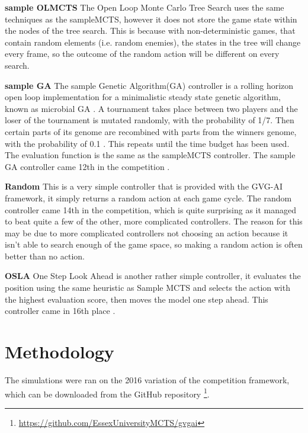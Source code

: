 \documentclass[journal]{IEEEtran}
\begin{document}
		\textbf{sample OLMCTS} \label{sssec:sampleOLMCTS}
			The Open Loop Monte Carlo Tree Search uses the same techniques as the sampleMCTS, however it does not store the game state within the nodes of the tree search. 
			This is because with non-deterministic games, that contain random elements (i.e. random enemies), the states in the tree will change every frame, so the outcome of the random action will be different on every search.
			

		\textbf{sample GA} \label{sssec:sampleGA}
			The sample Genetic Algorithm(GA) controller is a rolling horizon open loop implementation for a minimalistic steady state genetic algorithm, known as microbial GA \cite{harvey2009microbial, perez20162014}.
			A tournament takes place between two players and the loser of the tournament is mutated randomly, with the probability of 1/7. Then certain parts of its genome are recombined with parts from the winners genome, with the probability of 0.1 \cite{perez20162014}. 
			This repeats until the time budget has been used. The evaluation function is the same as the sampleMCTS controller. 
			The sample GA controller came 12th in the competition \cite{perez20162014}.
			

		\textbf{Random}
			This is a very simple controller that is provided with the GVG-AI framework, it simply returns a random action at each game cycle.
			The random controller came 14th in the competition, which is quite surprising as it managed to beat quite a few of the other, more complicated controllers. 
			The reason for this may be due to more complicated controllers not choosing an action because it isn't able to search enough of the game space, so making a random action is often better than no action.

		\textbf{OSLA}
			One Step Look Ahead is another rather simple controller, it evaluates the position using the same heuristic as Sample MCTS and selects the action with the highest evaluation score, then moves the model one step ahead. This controller came in 16th place \cite{perez20162014}.

	
		
	
	
\section{Methodology}	
	
	The simulations were ran on the 2016 variation of the competition framework, which can be downloaded from the GitHub repository \footnote{ \url{https://github.com/EssexUniversityMCTS/gvgai}}.
	
\end{document}
